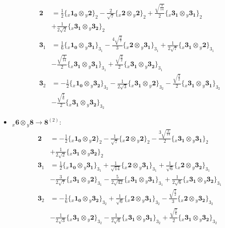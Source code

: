 \documentclass[english]{article}
\newcommand{\rep}[1]{\mathbf{#1}}
\newcommand{\repx}[2]{{}_{#2}\mathbf{#1}}
\newcommand{\tsprodx}[2]{\repx{#1}{x}\otimes\repx{#2}{y}}
\newcommand{\subcgs}[3]{\big\{ \tsprodx{#1}{#2}\big\}^{}_{#3}}
\begin{document}
\begin{itemize}
\begin{align*}
\rep{2} & = \frac{1}{2}\subcgs{1_{0}}{2}{2}-\frac{2}{\sqrt{7}}\subcgs{2}{2}{2}+\frac{\sqrt{\frac{3}{14}}}{2}\subcgs{3_{1}}{3_{1}}{2} \\ 
 & +\frac{1}{2 \sqrt{2}}\subcgs{3_{1}}{3_{2}}{2}
\\
\rep{3}_{1} & = \frac{1}{6}\subcgs{1_{0}}{3_{1}}{3_{1}}-\frac{4 \sqrt{\frac{2}{7}}}{3}\subcgs{2}{3_{1}}{3_{1}}+\frac{1}{2 \sqrt{7}}\subcgs{3_{1}}{2}{3_{1}} \\ 
 & -\frac{\sqrt{\frac{3}{14}}}{2}\subcgs{3_{1}}{3_{1}}{3_{1}}+\frac{\sqrt{\frac{3}{2}}}{2}\subcgs{3_{1}}{3_{2}}{3_{1}}
\\
\rep{3}_{2} & = -\frac{1}{2}\subcgs{1_{0}}{3_{2}}{3_{2}}-\frac{1}{2 \sqrt{3}}\subcgs{3_{1}}{2}{3_{2}}-\frac{\sqrt{\frac{3}{2}}}{2}\subcgs{3_{1}}{3_{1}}{3_{2}} \\ 
 & -\frac{\sqrt{\frac{7}{6}}}{2}\subcgs{3_{1}}{3_{2}}{3_{2}}
\end{align*}
\item $\tsprodx{6}{8}\to\rep{8}^{(2)}$:
\begin{align*}
\rep{2} & = -\frac{1}{2}\subcgs{1_{0}}{2}{2}-\frac{1}{\sqrt{7}}\subcgs{2}{2}{2}-\frac{3 \sqrt{\frac{3}{14}}}{2}\subcgs{3_{1}}{3_{1}}{2} \\ 
 & +\frac{1}{2 \sqrt{2}}\subcgs{3_{1}}{3_{2}}{2}
\\
\rep{3}_{1} & = \frac{1}{2}\subcgs{1_{0}}{3_{1}}{3_{1}}+\frac{1}{\sqrt{14}}\subcgs{2}{3_{1}}{3_{1}}+\frac{1}{\sqrt{6}}\subcgs{2}{3_{2}}{3_{1}} \\ 
 & -\frac{3}{2 \sqrt{7}}\subcgs{3_{1}}{2}{3_{1}}-\frac{5}{2 \sqrt{42}}\subcgs{3_{1}}{3_{1}}{3_{1}}+\frac{1}{2 \sqrt{6}}\subcgs{3_{1}}{3_{2}}{3_{1}}
\\
\rep{3}_{2} & = -\frac{1}{6}\subcgs{1_{0}}{3_{2}}{3_{2}}+\frac{1}{\sqrt{6}}\subcgs{2}{3_{1}}{3_{2}}-\frac{\sqrt{\frac{7}{2}}}{3}\subcgs{2}{3_{2}}{3_{2}} \\ 
 & -\frac{1}{2 \sqrt{3}}\subcgs{3_{1}}{2}{3_{2}}-\frac{1}{2 \sqrt{6}}\subcgs{3_{1}}{3_{1}}{3_{2}}+\frac{\sqrt{\frac{7}{6}}}{2}\subcgs{3_{1}}{3_{2}}{3_{2}}
\end{align*}
\end{itemize}
\end{document}
